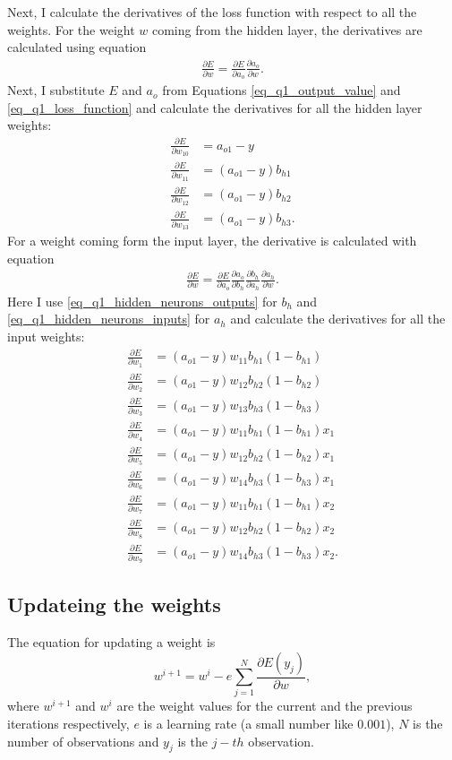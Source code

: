 Next, I calculate the derivatives of the loss function with respect to all the weights. For the weight $w$ coming from the hidden layer, the derivatives are calculated using equation
\begin{align*}
  \frac{\partial E}{\partial w} = \frac{\partial E}{\partial a_o} \frac{\partial a_o} {\partial w}.
\end{align*}
Next, I substitute $E$ and $a_o$ from Equations \ref{eq_q1_output_value} and \ref{eq_q1_loss_function} and calculate the derivatives for all the hidden layer weights:
\begin{align*}
  \frac{\partial E}{\partial w_{10}} &= a_{o1} - y \\
  \frac{\partial E}{\partial w_{11}} &= (a_{o1} - y) b_{h1} \\
  \frac{\partial E}{\partial w_{12}} &= (a_{o1} - y) b_{h2} \\
  \frac{\partial E}{\partial w_{13}} &= (a_{o1} - y) b_{h3}.
\end{align*}
For a weight coming form the input layer, the derivative is calculated with equation
\begin{align*}
  \frac{\partial E}{\partial w} = \frac{\partial E}{\partial a_o} \frac{\partial a_o} {\partial b_h} \frac{\partial b_h} {\partial a_h} \frac{\partial a_h} {\partial w}.
\end{align*}
Here I use \autoref{eq_q1_hidden_neurons_outputs} for $b_h$ and \autoref{eq_q1_hidden_neurons_inputs} for $a_h$ and calculate the derivatives for all the input weights:
\begin{align*}
  \frac{\partial E}{\partial w_{1}} &= (a_{o1} - y) w_{11} b_{h1} (1 - b_{h1}) \\
  \frac{\partial E}{\partial w_{2}} &= (a_{o1} - y) w_{12} b_{h2} (1 - b_{h2}) \\
  \frac{\partial E}{\partial w_{3}} &= (a_{o1} - y) w_{13} b_{h3} (1 - b_{h3}) \\
  \frac{\partial E}{\partial w_{4}} &= (a_{o1} - y) w_{11} b_{h1} (1 - b_{h1}) x_1 \\
  \frac{\partial E}{\partial w_{5}} &= (a_{o1} - y) w_{12} b_{h2} (1 - b_{h2}) x_1 \\
  \frac{\partial E}{\partial w_{6}} &= (a_{o1} - y) w_{14} b_{h3} (1 - b_{h3}) x_1 \\
  \frac{\partial E}{\partial w_{7}} &= (a_{o1} - y) w_{11} b_{h1} (1 - b_{h1}) x_2 \\
  \frac{\partial E}{\partial w_{8}} &= (a_{o1} - y) w_{12} b_{h2} (1 - b_{h2}) x_2 \\
  \frac{\partial E}{\partial w_{9}} &= (a_{o1} - y) w_{14} b_{h3} (1 - b_{h3}) x_2.
\end{align*}

\subsection{Updateing the weights}

The equation for updating a weight is
\[
  w^{i+1} = w^{i} - e \sum_{j=1}^{N} \frac{\partial E(y_j)}{\partial w},
\]
where $w^{i+1}$ and $w^{i}$ are the weight values for the current and the previous iterations respectively, $e$ is a learning rate (a small number like $0.001$), $N$ is the number of observations and $y_j$ is the $j-th$ observation.
